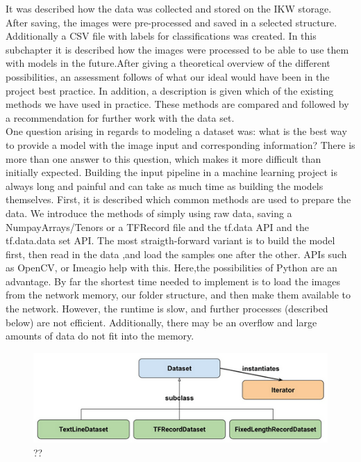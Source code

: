 It was described how the data was collected and stored on the IKW storage. After saving, the images were pre-processed and saved in a selected structure. Additionally a CSV file with labels for classifications was created. In this subchapter it is described how the images were processed to be able to use them with models in the future.After giving a theoretical overview of the different possibilities, an assessment follows of what our ideal would have been in the project best practice.  In addition, a description is given which of the existing methods we have used in practice. These methods are compared and followed by a recommendation for further work with the data set. \\
One question arising in regards to modeling a dataset was: what is the best way to provide a model with the image input and corresponding information? There is more than one answer to this question, which makes it more difficult than initially expected. Building the input pipeline in a machine learning project is always long and painful and can take as much time as building the models themselves. First, it is described which common methods are used to prepare the data. We introduce the methods of simply using raw data, saving a NumpayArrays/Tenors or a TFRecord file and the tf.data API and the tf.data.data set API. 
The most straigth-forward variant is to build the model first, then read in the data ,and load the samples one after the other. APIs such as OpenCV, or Imeagio help with this. Here,the possibilities of Python are an advantage. By far the shortest time needed to implement is to load the images from the network memory, our folder structure, and then make them available to the network. However, the runtime is slow, and further processes (described below) are not efficient. Additionally, there may be an overflow and large amounts of data do not fit into the memory. 


\begin{figure}[h]
	\centering
	\includegraphics[scale=0.6]{Figures/chapter03/dataset_tf}
	\decoRule
	\caption[??]{??}
	\label{fig:DatasetTF}
\end{figure}

